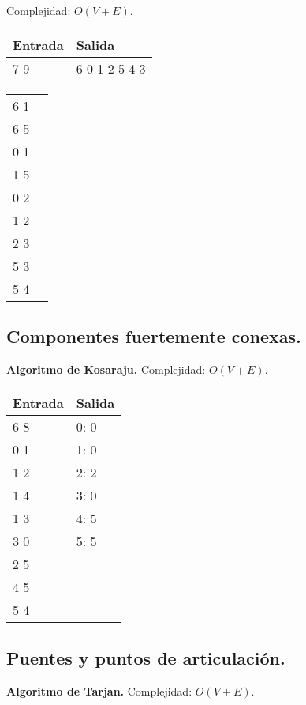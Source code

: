 \documentclass[10pt, letterpaper, twoside]{article}
\begin{document}
Complejidad: $O(V + E)$.



\begin{tabular}{|p{7cm}|p{7cm}|}
\hline
\textbf{Entrada} & \textbf{Salida} \\ \hline
7 9 & 6 0 1 2 5 4 3 \\
\end{tabular}

\begin{tabular}{|p{7cm}|p{7cm}|}
6 1 & \\
6 5 & \\
0 1 & \\
1 5 & \\
0 2 & \\
1 2 & \\
2 3 & \\
5 3 & \\ 
5 4 & \\ \hline
\end{tabular}

\subsection{Componentes fuertemente conexas.}

\textbf{Algoritmo de Kosaraju.} Complejidad: $O(V + E)$.



\begin{tabular}{|p{7cm}|p{7cm}|}
\hline
\textbf{Entrada} & \textbf{Salida} \\ \hline
6 8 & 0: 0\\
0 1 & 1: 0\\
1 2 & 2: 2\\
1 4 & 3: 0\\ 
1 3 & 4: 5\\
3 0 & 5: 5\\
2 5 & \\
4 5 & \\
5 4 & \\ \hline
\end{tabular}

\subsection{Puentes y puntos de articulación.}

\textbf{Algoritmo de Tarjan.} Complejidad: $O(V + E)$.
\end{document}
